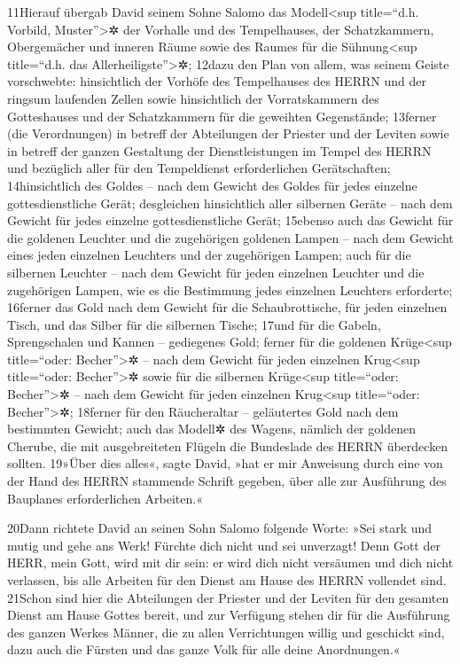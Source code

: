 11Hierauf übergab David seinem Sohne Salomo das Modell\textless sup
title=``d.h. Vorbild, Muster''\textgreater✲ der Vorhalle und des
Tempelhauses, der Schatzkammern, Obergemächer und inneren Räume sowie
des Raumes für die Sühnung\textless sup title=``d.h. das
Allerheiligste''\textgreater✲; 12dazu den Plan von allem, was seinem
Geiste vorschwebte: hinsichtlich der Vorhöfe des Tempelhauses des HERRN
und der ringsum laufenden Zellen sowie hinsichtlich der Vorratskammern
des Gotteshauses und der Schatzkammern für die geweihten Gegenstände;
13ferner (die Verordnungen) in betreff der Abteilungen der Priester und
der Leviten sowie in betreff der ganzen Gestaltung der Dienstleistungen
im Tempel des HERRN und bezüglich aller für den Tempeldienst
erforderlichen Gerätschaften; 14hinsichtlich des Goldes -- nach dem
Gewicht des Goldes für jedes einzelne gottesdienstliche Gerät;
desgleichen hinsichtlich aller silbernen Geräte -- nach dem Gewicht für
jedes einzelne gottesdienstliche Gerät; 15ebenso auch das Gewicht für
die goldenen Leuchter und die zugehörigen goldenen Lampen -- nach dem
Gewicht eines jeden einzelnen Leuchters und der zugehörigen Lampen; auch
für die silbernen Leuchter -- nach dem Gewicht für jeden einzelnen
Leuchter und die zugehörigen Lampen, wie es die Bestimmung jedes
einzelnen Leuchters erforderte; 16ferner das Gold nach dem Gewicht für
die Schaubrottische, für jeden einzelnen Tisch, und das Silber für die
silbernen Tische; 17und für die Gabeln, Sprengschalen und Kannen --
gediegenes Gold; ferner für die goldenen Krüge\textless sup
title=``oder: Becher''\textgreater✲ -- nach dem Gewicht für jeden
einzelnen Krug\textless sup title=``oder: Becher''\textgreater✲ sowie
für die silbernen Krüge\textless sup title=``oder: Becher''\textgreater✲
-- nach dem Gewicht für jeden einzelnen Krug\textless sup title=``oder:
Becher''\textgreater✲; 18ferner für den Räucheraltar -- geläutertes Gold
nach dem bestimmten Gewicht; auch das Modell✲ des Wagens, nämlich der
goldenen Cherube, die mit ausgebreiteten Flügeln die Bundeslade des
HERRN überdecken sollten. 19»Über dies alles«, sagte David, »hat er mir
Anweisung durch eine von der Hand des HERRN stammende Schrift gegeben,
über alle zur Ausführung des Bauplanes erforderlichen Arbeiten.«

20Dann richtete David an seinen Sohn Salomo folgende Worte: »Sei stark
und mutig und gehe ans Werk! Fürchte dich nicht und sei unverzagt! Denn
Gott der HERR, mein Gott, wird mit dir sein: er wird dich nicht
versäumen und dich nicht verlassen, bis alle Arbeiten für den Dienst am
Hause des HERRN vollendet sind. 21Schon sind hier die Abteilungen der
Priester und der Leviten für den gesamten Dienst am Hause Gottes bereit,
und zur Verfügung stehen dir für die Ausführung des ganzen Werkes
Männer, die zu allen Verrichtungen willig und geschickt sind, dazu auch
die Fürsten und das ganze Volk für alle deine Anordnungen.«

